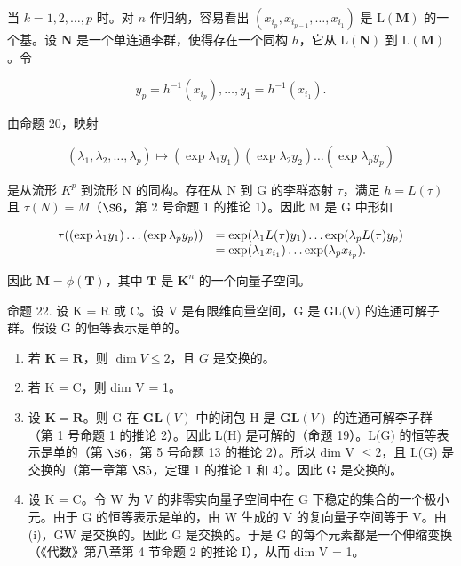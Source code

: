 当 \(k = 1, 2, \ldots, p\) 时。对 \(n\) 作归纳，容易看出 \((x_{i_p}, x_{i_{p-1}}, \ldots, x_{i_1})\) 是 \(\mathrm{L}(\mathbf{M})\) 的一个基。设 \(\mathbf{N}\) 是一个单连通李群，使得存在一个同构 \(h\)，它从 \(\mathrm{L}(\mathbf{N})\) 到 \(\mathrm{L}(\mathbf{M})\)。令

\[
y _ {p} = h ^ {- 1} (x _ {i _ {p}}), \dots , y _ {1} = h ^ {- 1} (x _ {i _ {1}}).
\]

由命题 20，映射

\[
\left(\lambda_ {1}, \lambda_ {2}, \dots , \lambda_ {p}\right) \mapsto \left(\exp \lambda_ {1} y _ {1}\right) \left(\exp \lambda_ {2} y _ {2}\right) \dots \left(\exp \lambda_ {p} y _ {p}\right)
\]

是从流形 \(K^{p}\) 到流形 N 的同构。存在从 N 到 G 的李群态射 \(\tau\)，满足 \(h = L(\tau)\) 且 \(\tau(N) = M\)（\(\S 6\)，第 2 号命题 1 的推论 1）。因此 M 是 G 中形如

\[
\begin{array}{r l} \tau ((\exp \lambda_ {1} y _ {1}) \dots (\exp \lambda_ {p} y _ {p})) & = \exp (\lambda_ {1} L (\tau) y _ {1}) \dots \exp (\lambda_ {p} L (\tau) y _ {p}) \\ & = \exp (\lambda_ {1} x _ {i _ {1}}) \dots \exp (\lambda_ {p} x _ {i _ {p}}). \end{array}
\]

因此 \(\mathbf{M} = \phi (\mathbf{T})\)，其中 \(\mathbf{T}\) 是 \(\mathbf{K}^n\) 的一个向量子空间。

命题 22. 设 K = R 或 C。设 V 是有限维向量空间，G 是 GL(V) 的连通可解子群。假设 G 的恒等表示是单的。

\begin{enumerate}
\def\labelenumi{(\roman{enumi})}
\item
  若 \(\mathbf{K} = \mathbf{R}\)，则 \(\dim V \leqslant 2\)，且 \(G\) 是交换的。
\item
  若 K = C，则 dim V = 1。
\item
  设 \(\mathbf{K} = \mathbf{R}\)。则 G 在 \(\mathbf{GL}(V)\) 中的闭包 H 是 \(\mathbf{GL}(V)\) 的连通可解李子群（第 1 号命题 1 的推论 2）。因此 L(H) 是可解的（命题 19）。L(G) 的恒等表示是单的（第 \(\S 6\)，第 5 号命题 13 的推论 2）。所以 dim V \(\leqslant 2\)，且 L(G) 是交换的（第一章第 \(\S 5\)，定理 1 的推论 1 和 4）。因此 G 是交换的。
\item
  设 K = C。令 W 为 V 的非零实向量子空间中在 G 下稳定的集合的一个极小元。由于 G 的恒等表示是单的，由 W 生成的 V 的复向量子空间等于 V。由 (i)，G\textbar W 是交换的。因此 G 是交换的。于是 G 的每个元素都是一个伸缩变换（《代数》第八章第 4 节命题 2 的推论 I），从而 dim V = 1。
\end{enumerate}

